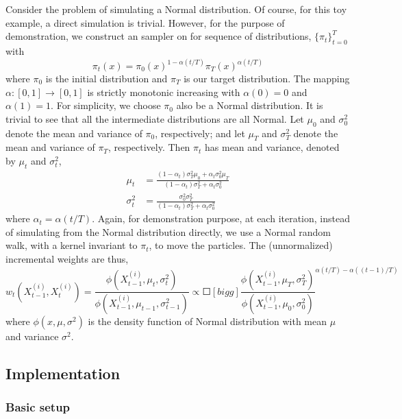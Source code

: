 Consider the problem of simulating a Normal distribution. Of course, for this
toy example, a direct simulation is trivial. However, for the purpose of
demonstration, we construct an \smc sampler on for sequence of distributions,
$\{\pi_t\}_{t=0}^T$ with
\begin{equation}
  \pi_t(x) = \pi_0(x)^{1 - \alpha(t/T)}\pi_T(x)^{\alpha(t/T)}
\end{equation}
where $\pi_0$ is the initial distribution and $\pi_T$ is our target
distribution. The mapping $\alpha:[0,1]\to[0,1]$ is strictly monotonic
increasing with $\alpha(0) = 0$ and $\alpha(1) = 1$. For simplicity, we choose
$\pi_0$ also be a Normal distribution. It is trivial to see that all the
intermediate distributions are all Normal. Let $\mu_0$ and $\sigma_0^2$ denote
the mean and variance of $\pi_0$, respectively; and let $\mu_T$ and
$\sigma_T^2$ denote the mean and variance of $\pi_T$, respectively. Then
$\pi_t$ has mean and variance, denoted by $\mu_t$ and $\sigma_t^2$,
\begin{align}
  \mu_t &= \frac{(1 - \alpha_t)\sigma_T^2\mu_0 + \alpha_t\sigma_0^2\mu_T}
  {(1 - \alpha_t)\sigma_T^2 + \alpha_t\sigma_0^2} \label{eq:mini mu_t}\\
  \sigma_t^2 &= \frac{\sigma_0^2\sigma_T^2}
  {(1 - \alpha_t)\sigma_T^2 + \alpha_t\sigma_0^2} \label{eq:mini var_t}
\end{align}
where $\alpha_t = \alpha(t/T)$. Again, for demonstration purpose, at each
iteration, instead of simulating from the Normal distribution directly, we use
a Normal random walk, with a kernel invariant to $\pi_t$, to move the
particles. The (unnormalized) incremental weights are thus,
\begin{equation}
  w_t(X_{t-1}^{(i)}, X_t^{(i)}) =
  \frac{\phi(X_{t-1}^{(i)},\mu_t,\sigma_t^2)}
  {\phi(X_{t-1}^{(i)},\mu_{t-1},\sigma_{t-1}^2)}
  \propto
  \Square[bigg]{\frac{\phi(X_{t-1}^{(i)},\mu_T,\sigma_T^2)}
    {\phi(X_{t-1}^{(i)},\mu_0,\sigma_0^2)}}^{\alpha(t/T) - \alpha((t-1)/T)}
  \label{eq:mini inc_weight}
\end{equation}
where $\phi(x,\mu,\sigma^2)$ is the density function of Normal distribution
with mean $\mu$ and variance $\sigma^2$.

\subsection{Implementation}
\label{sub:Implementation}

\subsubsection{Basic setup}
\label{ssub:Basic setup}

